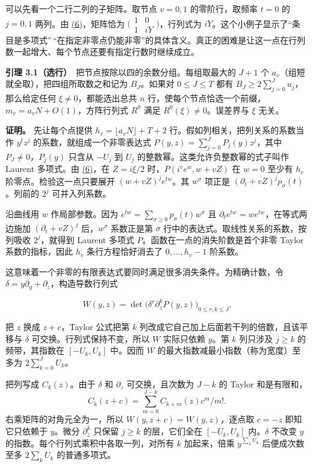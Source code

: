 \documentclass[11pt,a4paper]{article}
\begin{document}
可以先看一个二行二列的子矩阵。取节点 \(v=0,1\) 的零阶行，取频率 \(t=0\) 的 \(j=0,1\) 两列。由 \hyperref[eq:6]{(6)}，矩阵恰为 \(\bigl(\begin{smallmatrix}1&0\\1&iY\end{smallmatrix}\bigr)\)，行列式为 \(iY\)。这个小例子显示了``条目是多项式''\,``在指定非零点仍能非零''的具体含义。真正的困难是让这一点在行列数一起增大、每个节点还要有指定行数时继续成立。

\textbf{引理 3.1（选行）}　把节点按除以四的余数分组。每组取最大的 \(J+1\) 个 \(a_v\)（组短就全取），把四组所取数之和记为 \(B_J\)。如果对 \(0\le J\le T\) 都有 \(B_J\ge2\sum_{j=0}^J u_j\)，那么给定任何 \(\xi\ne0\)，都能选出总共 \(n\) 行，使每个节点恰选一个前缀，\(m_v=a_vN+O(1)\)，方阵行列式 \(R^0\) 满足 \(R^0(\xi)\ne0\)。误差界与 \(\xi\) 无关。

\textbf{证明。} 先让每个点提供 \(h_v=\lfloor a_vN\rfloor+T+2\) 行。假如列相关，把列关系的系数当作 \(y^t z^j\) 的系数，就组成一个非零表达式 \(P(y,z)=\sum_{j=0}^JP_j(y)z^j\)，其中 \(P_J\ne0\)，\(P_j(y)\) 只含从 \(-U_j\) 到 \(U_j\) 的整数幂。这类允许负整数幂的式子叫作 Laurent 多项式。由 \hyperref[eq:6]{(6)}，在 \(Z=i\xi/2\) 时，\(P(i^ve^w,w+vZ)\) 在 \(w=0\) 至少有 \(h_v\) 阶零点。检验这一点只要展开 \((w+vZ)^je^{tw}\)。其 \(w^\sigma\) 项正是 \((\partial_t+vZ)^jp_\sigma(t)\)。列前的 \(2^j\) 可并入列系数。

沿曲线用 \(w\) 作局部参数。因为 \(e^{tw}=\sum_{\sigma\ge0}p_\sigma(t)w^\sigma\) 且 \(\partial_t e^{tw}=we^{tw}\)，在等式两边施加 \((\partial_t+vZ)^j\) 后，\(w^\sigma\) 系数正是第 \(\sigma\) 行中的表达式。取线性关系的系数，按列吸收 \(2^j\)，就得到 Laurent 多项式 \(P\)。函数在一点的消失阶数是首个非零 Taylor 系数的指标，因此 \(h_v\) 条行方程恰好消去了 \(0,\ldots,h_v-1\) 阶系数。

这意味着一个非零的有限表达式要同时满足很多消失条件。为精确计数，令 \(\delta=y\partial_y+\partial_z\)，构造导数行列式

\[
 W(y,z)=\det\big(\delta^r\partial_z^k P(y,z)\big)_{0\le r,k\le J}.
\]

把 \(z\) 换成 \(z+c\)，Taylor 公式把第 \(k\) 列改成它自己加上后面若干列的倍数，且该平移与 \(\delta\) 可交换。行列式保持不变，所以 \(W\) 实际只依赖 \(y\)。第 \(k\) 列只涉及 \(j\ge k\) 的频带，其指数在 \([-U_k,U_k]\) 中。因而 \(W\) 的最大指数减最小指数（称为宽度）至多为 \(2\sum_{k=0}^J U_k\)。

把列写成 \(C_k(z)\)。由于 \(\delta\) 和 \(\partial_z\) 可交换，且次数为 \(J-k\) 的 Taylor 和是有限和， \[
 C_k(z+c)=\sum_{m=0}^{J-k}C_{k+m}(z)c^m/m!.
\] 右乘矩阵的对角元全为一，所以 \(W(y,z+c)=W(y,z)\)，逐点取 \(c=-z\) 即知它只依赖于 \(y\)。微分 \(\partial_z^k\) 只保留 \(j\ge k\) 的层，它们全在 \([-U_k,U_k]\) 内。\(\delta\) 不改变 \(y\) 的指数。每个行列式乘积中各取一列，对所有 \(k\) 加起来，倍乘 \(y^{\sum_kU_k}\) 后便成次数至多 \(2\sum_k U_k\) 的普通多项式。
\end{document}
